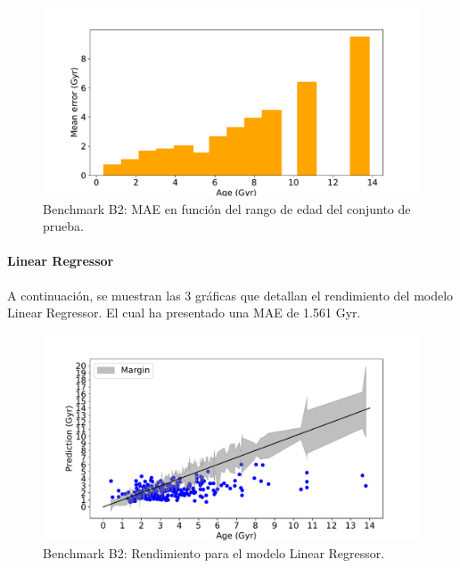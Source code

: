 \begin{figure}[H]
\begin{center}
 \includegraphics[width=0.8\linewidth]{Figuras/Experimentos/B_B2_dtr_3.pdf}
\end{center}
\caption{Benchmark B2: MAE en función del rango de edad del conjunto de prueba.}
 \label{fig:benchB2_details_dtr_3}
\end{figure}

\paragraph{Linear Regressor} 
A continuación, se muestran las 3 gráficas que detallan el rendimiento del modelo Linear Regressor. El cual ha presentado una MAE de 1.561 Gyr.
\begin{figure}[H]
\begin{center}
 \includegraphics[width=0.8\linewidth]{Figuras/Experimentos/B_B2_lr_1.pdf}
\end{center}
\caption{Benchmark B2: Rendimiento para el modelo Linear Regressor.}
 \label{fig:benchB2_details_lr_1}
\end{figure}

